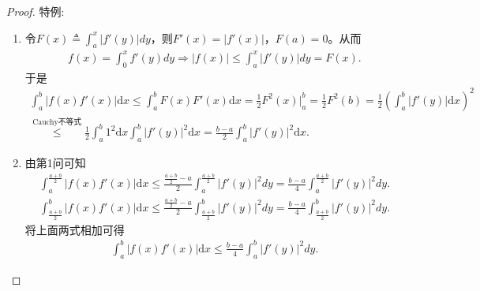 \documentclass[../../main.tex]{subfiles}
\begin{document}
\begin{proof}
{\heiti 特例:}
\begin{enumerate}
\item 令\(F(x) \triangleq \int_{a}^{x}|f'(y)|dy\)，则\(F'(x) = |f'(x)|\)，\(F(a) = 0\)。从而
\begin{align*}
f(x) = \int_{0}^{x}f'(y)dy \Rightarrow |f(x)| \leqslant \int_{a}^{x}|f'(y)|dy = F(x).
\end{align*}
于是
\begin{align*}
\int_{a}^{b}|f(x)f'(x)|\mathrm{d}x \leqslant \int_{a}^{b}F(x)F'(x)\mathrm{d}x = \frac{1}{2}F^2(x)\big|_{a}^{b} = \frac{1}{2}F^2(b) = \frac{1}{2}\left( \int_{a}^{b}|f'(y)|\mathrm{d}x \right)^2 \\
\overset{\text{Cauchy不等式}}{\leqslant} \frac{1}{2}\int_{a}^{b}1^2\mathrm{d}x \int_{a}^{b}|f'(y)|^2\mathrm{d}x = \frac{b - a}{2}\int_{a}^{b}|f'(y)|^2\mathrm{d}x.
\end{align*}

\item 由第1问可知
\begin{align*}
\int_{a}^{\frac{a + b}{2}}|f(x)f'(x)|\mathrm{d}x \leqslant \frac{\frac{a + b}{2} - a}{2}\int_{a}^{\frac{a + b}{2}}|f'(y)|^2dy = \frac{b - a}{4}\int_{a}^{\frac{a + b}{2}}|f'(y)|^2dy.
\end{align*}
\begin{align*}
\int_{\frac{a + b}{2}}^{b}|f(x)f'(x)|\mathrm{d}x \leqslant \frac{\frac{a + b}{2} - a}{2}\int_{\frac{a + b}{2}}^{b}|f'(y)|^2dy = \frac{b - a}{4}\int_{\frac{a + b}{2}}^{b}|f'(y)|^2dy.
\end{align*}
将上面两式相加可得
\begin{align*}
\int_{a}^{b}|f(x)f'(x)|\mathrm{d}x \leqslant \frac{b - a}{4}\int_{a}^{b}|f'(y)|^2dy.
\end{align*}
\end{enumerate}


\end{proof}
\end{document}
